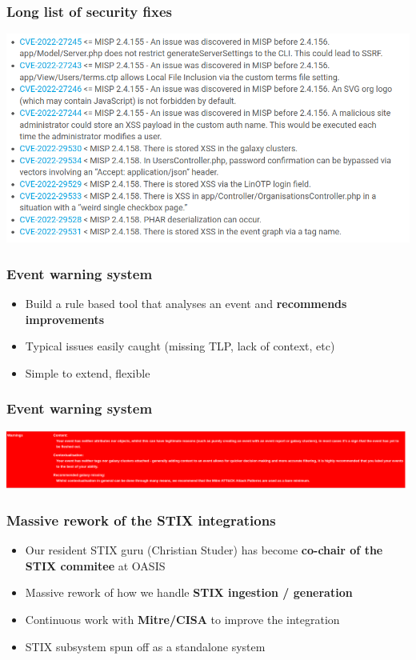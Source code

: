 \begin{frame}
\frametitle{Long list of security fixes}
\includegraphics[scale=0.4]{images/security.png}
\end{frame}


\begin{frame}
  \frametitle{Event warning system}
  \begin{itemize}
     \item Build a rule based tool that analyses an event and {\bf recommends improvements}
     \item Typical issues easily caught (missing TLP, lack of context, etc)
     \item Simple to extend, flexible
  \end{itemize}
\end{frame}

\begin{frame}
\frametitle{Event warning system}
\includegraphics[scale=0.3]{images/warnings.png}
\end{frame}


\begin{frame}
  \frametitle{Massive rework of the STIX integrations}
  \begin{itemize}
     \item Our resident STIX guru (Christian Studer) has become {\bf co-chair of the STIX commitee} at OASIS
     \item Massive rework of how we handle {\bf STIX ingestion / generation}
     \item Continuous work with {\bf Mitre/CISA} to improve the integration
     \item STIX subsystem spun off as a standalone system
  \end{itemize}
\end{frame}


